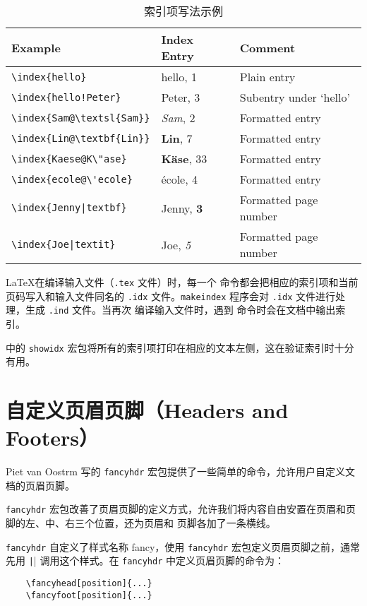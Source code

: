 \documentclass[UTF8]{ctexart}
\begin{document}
\begin{table}[H]
\caption{索引项写法示例}
\label{tab:index}
\begin{center}
\begin{tabular}{@{}lll@{}}
  \textbf{Example} &\textbf{Index Entry} &\textbf{Comment}\\\hline
  \rule{0pt}{1.05em}\verb|\index{hello}| &hello, 1 &Plain entry\\
\verb|\index{hello!Peter}|   &\hspace*{2ex}Peter, 3 &Subentry under `hello'\\
\verb|\index{Sam@\textsl{Sam}}|     &\textsl{Sam}, 2& Formatted entry\\
\verb|\index{Lin@\textbf{Lin}}|     &\textbf{Lin}, 7& Formatted entry\\
\verb|\index{Kaese@K\"ase}|     &\textbf{K\"ase}, 33& Formatted entry\\
\verb.\index{ecole@\'ecole}.     &\'ecole, 4& Formatted entry\\
\verb.\index{Jenny|textbf}.     &Jenny, \textbf{3}& Formatted page number\\
\verb.\index{Joe|textit}.     &Joe, \textit{5}& Formatted page number
\end{tabular}
\end{center}
\end{table}

\LaTeX 在编译输入文件（\texttt{.tex} 文件）时，每一个 \texttt{\index} 命令都会把相应的索引项和当前页码写入和输入文件同名的
\texttt{.idx} 文件。\texttt{makeindex} 程序会对 \texttt{.idx} 文件进行处理，生成 \texttt{.ind} 文件。当再次
编译输入文件时，遇到 \texttt{\printindex} 命令时会在文档中输出索引。

\LaTeXe{} 中的 \texttt{showidx} 宏包将所有的索引项打印在相应的文本左侧，这在验证索引时十分有用。

\section{自定义页眉页脚（Headers and Footers）}
Piet van Oostrm 写的 \texttt{fancyhdr} 宏包提供了一些简单的命令，允许用户自定义文档的页眉页脚。

\texttt{fancyhdr} 宏包改善了页眉页脚的定义方式，允许我们将内容自由安置在页眉和页脚的左、中、右三个位置，还为页眉和
页脚各加了一条横线。

\texttt{fancyhdr} 自定义了样式名称 fancy，使用 \texttt{fancyhdr} 宏包定义页眉页脚之前，通常先用
\texttt|\pagestyle{fancy}| 调用这个样式。在 \texttt{fancyhdr} 中定义页眉页脚的命令为：
\begin{verbatim}
    \fancyhead[position]{...}
    \fancyfoot[position]{...}
\end{verbatim}
\end{document}
